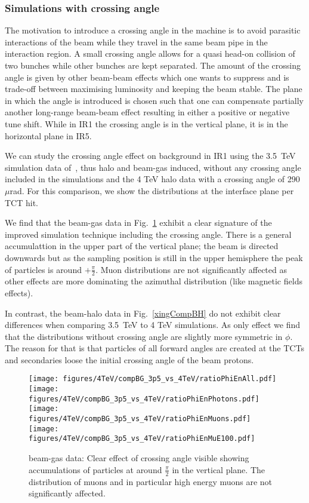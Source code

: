\subsubsection{Simulations with crossing angle}
The motivation to introduce a crossing angle in the machine is to avoid parasitic interactions of the beam while they travel in the same beam pipe in the interaction region. A small crossing angle allows for a quasi head-on collision of two bunches while other bunches are kept separated. The amount of the crossing angle is given by other beam-beam effects which one wants to suppress and is trade-off between maximising luminosity and keeping the beam stable. The plane in which the angle is introduced is chosen such that one can compensate partially another long-range beam-beam effect resulting in either a positive or negative tune shift. While in IR1 the crossing angle is in the vertical plane, it is in the horizontal plane in IR5.

We can study the crossing angle effect on background in IR1 using the 3.5~TeV simulation data of~\cite{nimPaperRod}, thus halo and beam-gas induced, without any crossing angle included in the simulations and the 4 TeV halo data with a crossing angle of 290~$\mu$rad. For this comparison, we show the distributions at the interface plane per TCT hit. 

We find that the beam-gas data in Fig.~\ref{xingCompBG} exhibit a clear signature of the improved simulation technique including the crossing angle. There is a general accumulattion in the upper part of the vertical plane; the beam is directed downwards but as the sampling position is still in the upper hemisphere the peak of particles is around $+ \frac{\pi}{2}$. Muon distributions are not significantly affected as other effects are more dominating the azimuthal distribution (like magnetic fields effects). 

In contrast, the beam-halo data in Fig.~\ref{xingCompBH} do not exhibit clear differences when comparing 3.5~TeV to 4 TeV simulations. As only effect we find that the distributions without crossing angle are slightly more symmetric in $\phi$. The reason for that is that particles of all forward angles are created at the TCTs and secondaries loose the initial crossing angle of the beam protons.

\begin{figure}
\begin{center}
  \texttt{[image: figures/4TeV/compBG\_3p5\_vs\_4TeV/ratioPhiEnAll.pdf]}
  \texttt{[image: figures/4TeV/compBG\_3p5\_vs\_4TeV/ratioPhiEnPhotons.pdf]}
  \texttt{[image: figures/4TeV/compBG\_3p5\_vs\_4TeV/ratioPhiEnMuons.pdf]}
  \texttt{[image: figures/4TeV/compBG\_3p5\_vs\_4TeV/ratioPhiEnMuE100.pdf]}
\end{center}
\vspace{-0.6cm}
 \caption{beam-gas data: Clear effect of crossing angle visible showing accumulations of particles at around $\frac{\pi}{2}$ in the vertical plane. The distribution of muons and in particular high energy muons are not significantly affected.
  \label{xingCompBG}}
\end{figure}

